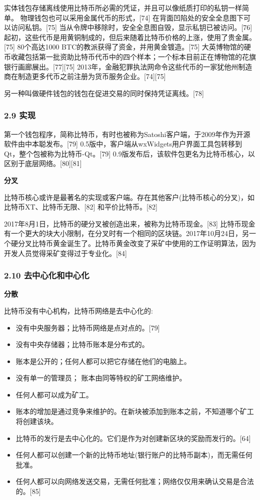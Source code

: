 实体钱包存储离线使用比特币所必需的凭证，并且可以像纸质打印的私钥一样简单。 物理钱包也可以采用金属代币的形式，[74] 在背面凹陷处的安全全息图下可以访问私钥。[75] 当从令牌中移除时，安全全息图自毁，显示私钥已被访问。[76] 起初，这些代币是用黄铜制成的，但后来随着比特币价格的上涨，使用了贵金属。[75] 80个高达1000 BTC的教派获得了资金，并用黄金镀造。[75] 大英博物馆的硬币收藏包括第一批资助比特币代币中的四个样本；一个标本目前正在博物馆的花旗银行画廊展出。[77][75] 2013年，金融犯罪执法网命令这些代币的一家犹他州制造商在制造更多代币之前注册为货币服务企业。[74][75]

另一种叫做硬件钱包的钱包在促进交易的同时保持凭证离线。[78]
\subsubsection{2.9 实现}
第一个钱包程序，简称比特币，有时也被称为Satoshi客户端，于2009年作为开源软件由中本聪发布。[79] 0.5版中，客户端从wxWidgets用户界面工具包转移到Qt，整个包被称为比特币-Qt。[79] 0.9版发布后，该软件包更名为比特币核心，以区别于底层网络。[80][81]

\textbf{分叉}

比特币核心或许是最著名的实现或客户端。存在其他客户(比特币核心的分叉)，如比特币XT、比特币无限、[82] 和平价比特币。[82]

2017年8月1日，比特币的硬分叉被创造出来，被称为比特币现金。[83] 比特币现金有一个更大的块大小限制，在分叉时有一个相同的区块链。2017年10月24日，另一个硬分叉比特币黄金诞生了。比特币黄金改变了采矿中使用的工作证明算法，因为开发人员觉得采矿变得过于专业化。[84]
\subsubsection{2.10 去中心化和中心化}
\textbf{分散}

比特币没有中心机构，比特币网络是去中心化的:
\begin{itemize}
\item 没有中央服务器；比特币网络是点对点的。[79]
\item 没有中央存储器；比特币账本是分布式的。
\item 账本是公开的；任何人都可以把它存储在他们的电脑上。
\item 没有单一的管理员； 账本由同等特权的矿工网络维护。
\item 任何人都可以成为矿工。
\item 账本的增加是通过竞争来维护的。在新块被添加到账本之前，不知道哪个矿工将创建该块。
\item 比特币的发行是去中心化的。它们是作为对创建新区块的奖励而发行的。[64]
\item 任何人都可以创建一个新的比特币地址(银行账户的比特币副本)，而无需任何批准。
\item 任何人都可以向网络发送交易，无需任何批准；网络仅仅用来确认交易是合法的。[85]
\end{itemize}

